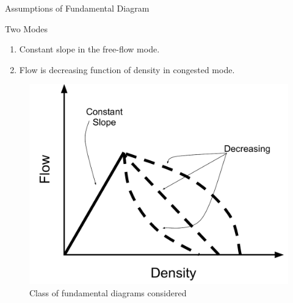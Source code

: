 \documentclass[english, smaller]{beamer}
\theoremstyle{plain}
\theoremstyle{definition}
\theoremstyle{plain}
\theoremstyle{plain}
\begin{document}
\begin{frame}{Assumptions of Fundamental Diagram}
\begin{block}
{Two Modes}
\begin{enumerate}
\item <1->Constant slope in the free-flow mode.
\item <2->Flow is decreasing function of density in congested mode.
\end{enumerate}
\end{block}

\begin{figure}
\begin{centering}
\includegraphics[scale=0.25]{../../figures/presentation/AnnotatedFundamentalDiagram}
\par\end{centering}
\caption{Class of fundamental diagrams considered}
\end{figure}



\end{frame}
\end{document}
